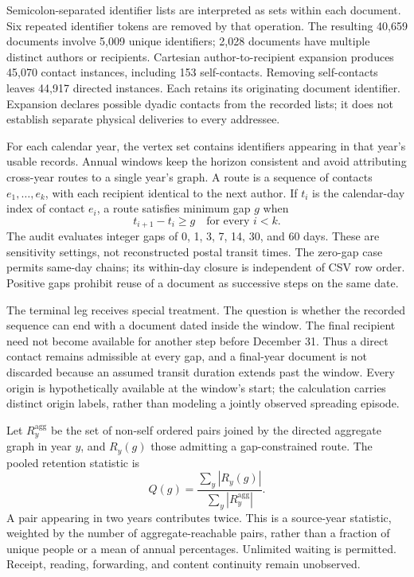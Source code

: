 \documentclass[11pt]{article}
\begin{document}
Semicolon-separated identifier lists are interpreted as sets within each document. Six repeated identifier tokens are removed by that operation. The resulting 40,659 documents involve 5,009 unique identifiers; 2,028 documents have multiple distinct authors or recipients. Cartesian author-to-recipient expansion produces 45,070 contact instances, including 153 self-contacts. Removing self-contacts leaves 44,917 directed instances. Each retains its originating document identifier. Expansion declares possible dyadic contacts from the recorded lists; it does not establish separate physical deliveries to every addressee.

For each calendar year, the vertex set contains identifiers appearing in that year's usable records. Annual windows keep the horizon consistent and avoid attributing cross-year routes to a single year's graph. A route is a sequence of contacts $e_1,\ldots,e_k$, with each recipient identical to the next author. If $t_i$ is the calendar-day index of contact $e_i$, a route satisfies minimum gap $g$ when
\begin{equation}
 t_{i+1}-t_i\geq g\quad\text{for every }i<k.
\end{equation}
The audit evaluates integer gaps of 0, 1, 3, 7, 14, 30, and 60 days. These are sensitivity settings, not reconstructed postal transit times. The zero-gap case permits same-day chains; its within-day closure is independent of CSV row order. Positive gaps prohibit reuse of a document as successive steps on the same date.

The terminal leg receives special treatment. The question is whether the recorded sequence can end with a document dated inside the window. The final recipient need not become available for another step before December 31. Thus a direct contact remains admissible at every gap, and a final-year document is not discarded because an assumed transit duration extends past the window. Every origin is hypothetically available at the window's start; the calculation carries distinct origin labels, rather than modeling a jointly observed spreading episode.

Let $R_y^{\mathrm{agg}}$ be the set of non-self ordered pairs joined by the directed aggregate graph in year $y$, and $R_y(g)$ those admitting a gap-constrained route. The pooled retention statistic is
\begin{equation}
 Q(g)=\frac{\sum_y |R_y(g)|}{\sum_y |R_y^{\mathrm{agg}}|}.
\end{equation}
A pair appearing in two years contributes twice. This is a source-year statistic, weighted by the number of aggregate-reachable pairs, rather than a fraction of unique people or a mean of annual percentages. Unlimited waiting is permitted. Receipt, reading, forwarding, and content continuity remain unobserved.
\end{document}
